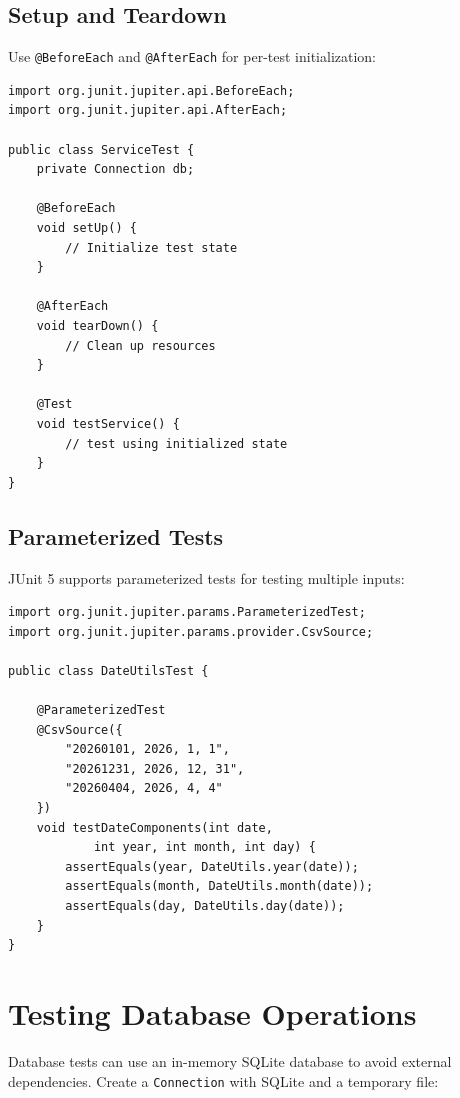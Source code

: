 \subsection{Setup and Teardown}

Use \texttt{@BeforeEach} and \texttt{@AfterEach} for per-test initialization:

\begin{lstlisting}[style=java]
import org.junit.jupiter.api.BeforeEach;
import org.junit.jupiter.api.AfterEach;

public class ServiceTest {
    private Connection db;

    @BeforeEach
    void setUp() {
        // Initialize test state
    }

    @AfterEach
    void tearDown() {
        // Clean up resources
    }

    @Test
    void testService() {
        // test using initialized state
    }
}
\end{lstlisting}

\subsection{Parameterized Tests}

JUnit 5 supports parameterized tests for testing multiple inputs:

\begin{lstlisting}[style=java]
import org.junit.jupiter.params.ParameterizedTest;
import org.junit.jupiter.params.provider.CsvSource;

public class DateUtilsTest {

    @ParameterizedTest
    @CsvSource({
        "20260101, 2026, 1, 1",
        "20261231, 2026, 12, 31",
        "20260404, 2026, 4, 4"
    })
    void testDateComponents(int date,
            int year, int month, int day) {
        assertEquals(year, DateUtils.year(date));
        assertEquals(month, DateUtils.month(date));
        assertEquals(day, DateUtils.day(date));
    }
}
\end{lstlisting}

\section{Testing Database Operations}
\label{sec:test-db}

Database tests can use an in-memory SQLite database to avoid external dependencies.  Create a \texttt{Connection} with SQLite and a temporary file:

